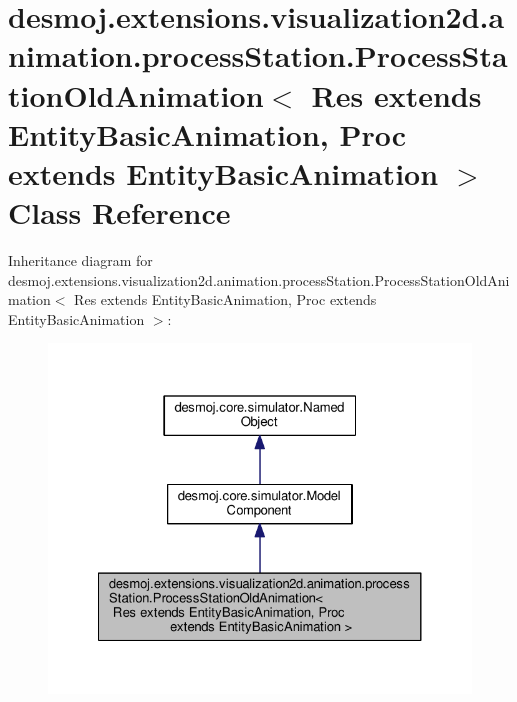 \section{desmoj.\-extensions.\-visualization2d.\-animation.\-process\-Station.\-Process\-Station\-Old\-Animation$<$ Res extends Entity\-Basic\-Animation, Proc extends Entity\-Basic\-Animation $>$ Class Reference}
\label{classdesmoj_1_1extensions_1_1visualization2d_1_1animation_1_1process_station_1_1_process_stationf1a16f866d56c789f45a544f658f58d2}


Inheritance diagram for desmoj.\-extensions.\-visualization2d.\-animation.\-process\-Station.\-Process\-Station\-Old\-Animation$<$ Res extends Entity\-Basic\-Animation, Proc extends Entity\-Basic\-Animation $>$\-:
\nopagebreak
\begin{figure}[H]
\begin{center}
\leavevmode
\includegraphics[width=326pt]{classdesmoj_1_1extensions_1_1visualization2d_1_1animation_1_1process_station_1_1_process_stationaee79c73a90aa94d19e515502a66d28b}
\end{center}
\end{figure}


